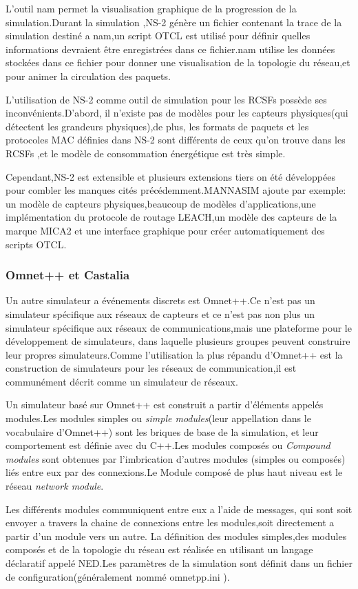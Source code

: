 L'outil nam permet la visualisation graphique de la progression de la simulation.Durant la simulation ,NS-2 génère un fichier  contenant la trace de la simulation destiné a nam,un script OTCL est utilisé pour définir quelles informations devraient être enregistrées dans ce fichier.nam utilise les données stockées dans ce fichier pour donner une visualisation de la topologie du réseau,et pour animer la circulation des paquets.

L'utilisation de NS-2 comme outil de simulation pour les RCSFs possède ses inconvénients.D'abord, il n'existe pas  de modèles pour les capteurs physiques(qui détectent les grandeurs physiques),de plus, les formats de paquets et les protocoles MAC définies dans NS-2 sont différents de ceux qu'on trouve dans les RCSFs ,et le modèle de consommation énergétique est très simple.

Cependant,NS-2 est extensible et plusieurs extensions tiers on été développées pour combler les manques cités précédemment.MANNASIM ajoute par exemple: un modèle de capteurs physiques,beaucoup de modèles d'applications,une implémentation du protocole de routage LEACH,un modèle des capteurs de la marque MICA2 et une interface graphique pour créer automatiquement des scripts OTCL.

\subsubsection{Omnet++ et Castalia}
Un autre simulateur a événements discrets est Omnet++.Ce n'est pas un simulateur spécifique aux réseaux de capteurs et ce n'est pas non plus un simulateur spécifique aux réseaux de communications,mais une plateforme pour le développement de simulateurs, dans laquelle plusieurs groupes peuvent construire leur propres simulateurs.Comme l'utilisation la plus répandu d'Omnet++ est la construction de simulateurs pour les réseaux de communication,il est communément décrit comme un simulateur de réseaux.

Un simulateur basé sur Omnet++ est construit a partir d'éléments appelés modules.Les modules simples ou \emph{simple modules}(leur appellation dans le vocabulaire d'Omnet++) sont les briques de base de la simulation, et leur comportement est définie avec du C++.Les modules composés ou \emph{Compound modules} sont obtenues par l'imbrication d'autres modules (simples ou composés) liés entre eux par des connexions.Le Module composé de plus haut niveau est le réseau \emph{network module}.

Les différents modules communiquent entre eux a l'aide de messages, qui sont soit envoyer a travers la chaine de connexions entre les modules,soit  directement a partir d'un module vers un autre.
La définition des modules simples,des modules composés et de la topologie du réseau est réalisée en utilisant un langage déclaratif appelé NED.Les paramètres de la simulation sont définit dans un fichier de configuration(généralement nommé omnetpp.ini ).

